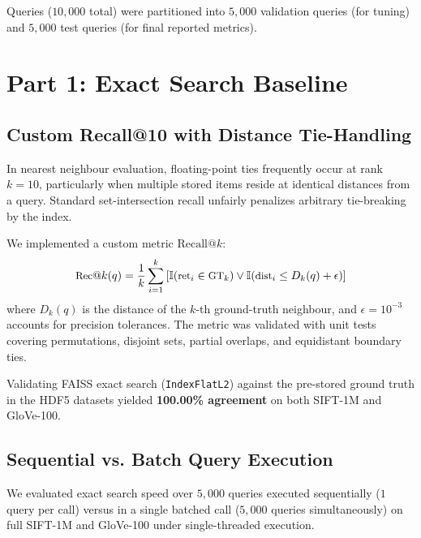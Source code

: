 \documentclass[10pt,twocolumn,a4paper]{article}
\begin{document}
Queries ($10,000$ total) were partitioned into $5,000$ validation queries (for tuning) and $5,000$ test queries (for final reported metrics).

\section{Part 1: Exact Search Baseline}

\subsection{Custom Recall@10 with Distance Tie-Handling}
In nearest neighbour evaluation, floating-point ties frequently occur at rank $k=10$, particularly when multiple stored items reside at identical distances from a query. Standard set-intersection recall unfairly penalizes arbitrary tie-breaking by the index. 

We implemented a custom metric $\text{Recall}@k$:
\begin{equation}
\small
    \text{Rec}@k(q) = \frac{1}{k} \sum_{i=1}^k \left[ \mathbb{I}(\text{ret}_i \in \text{GT}_k) \lor \mathbb{I}(\text{dist}_i \le D_k(q) + \epsilon) \right]
\end{equation}
where $D_k(q)$ is the distance of the $k$-th ground-truth neighbour, and $\epsilon = 10^{-3}$ accounts for precision tolerances. The metric was validated with unit tests covering permutations, disjoint sets, partial overlaps, and equidistant boundary ties. 

Validating FAISS exact search (\texttt{IndexFlatL2}) against the pre-stored ground truth in the HDF5 datasets yielded \textbf{100.00\% agreement} on both SIFT-1M and GloVe-100.

\subsection{Sequential vs. Batch Query Execution}
We evaluated exact search speed over $5,000$ queries executed sequentially ($1$ query per call) versus in a single batched call ($5,000$ queries simultaneously) on full SIFT-1M and GloVe-100 under single-threaded execution.

\begin{table}[H]
\centering
\small
\caption{Exact Search Baseline Performance (Single Thread)}
\label{tab:exact_baseline}
\end{table}
\end{document}
